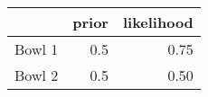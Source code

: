 \begin{tabular}{lrr}
\toprule
{} &  prior &  likelihood \\
\midrule
Bowl 1 &    0.5 &        0.75 \\
Bowl 2 &    0.5 &        0.50 \\
\bottomrule
\end{tabular}
